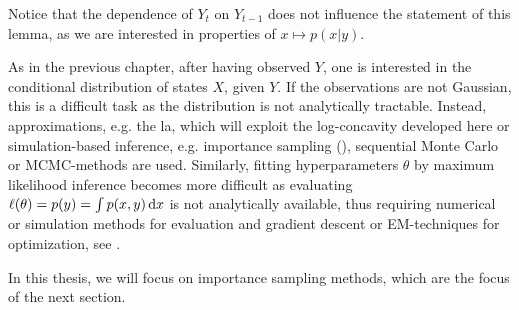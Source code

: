 Notice that the dependence of $Y_{t}$ on $Y_{t - 1}$ does not influence the statement of this lemma, as we are interested in properties of $x \mapsto p(x|y)$.

As in the previous chapter, after having observed $Y$, one is interested in the conditional distribution of states $X$, given $Y$. If the observations are not Gaussian, this is a difficult task as the distribution is not analytically tractable. Instead, approximations, e.g. the \gls{la}, which will exploit the log-concavity developed here or simulation-based inference, e.g. importance sampling (), sequential Monte Carlo \citep{Chopin2020Introduction} or MCMC-methods \citep{Brooks2011Handbook} are used. Similarly, fitting hyperparameters $\theta$ by maximum likelihood inference becomes more difficult as evaluating $\ell(\theta) = p(y) = \int p(x,y) \,\mathrm d x$ is not analytically available, thus requiring numerical or simulation methods for evaluation and gradient descent or EM-techniques for optimization, see .

In this thesis, we will focus on importance sampling methods, which are the focus of the next section.